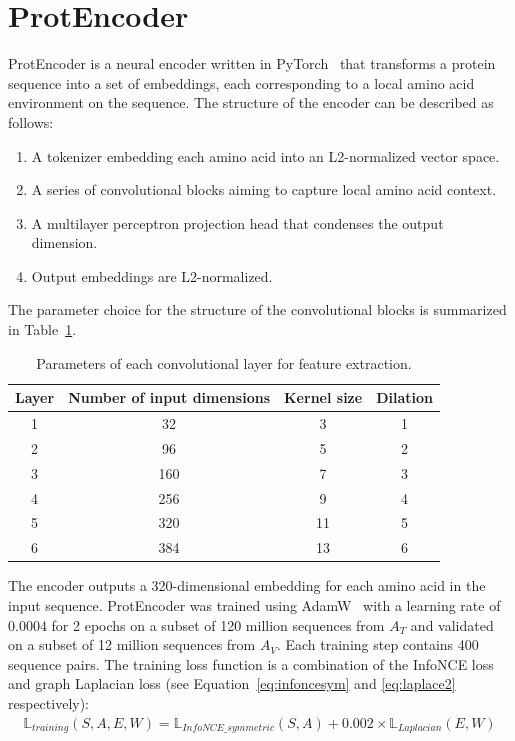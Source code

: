 \documentclass[twoside,a4paper]{master}
\begin{document}
\section{ProtEncoder}
ProtEncoder is a neural encoder written in PyTorch~\cite{10.5555/3454287.3455008} that transforms a protein sequence into a set of embeddings, each corresponding to a local amino acid environment on the sequence. The structure of the encoder can be described as follows:
\begin{enumerate}
    \item A tokenizer embedding each amino acid into an L2-normalized vector space.
    \item A series of convolutional blocks aiming to capture local amino acid context.
    \item A multilayer perceptron projection head that condenses the output dimension.
    \item Output embeddings are L2-normalized.
\end{enumerate}

The parameter choice for the structure of the convolutional blocks is summarized in Table~\ref{tab:conv}.

\begin{table}
\begin{center}
\begin{tabular}{|c|c|c|c|}
\hline
Layer & Number of input dimensions & Kernel size & Dilation \\
\hline
1& 32 & 3 & 1 \\
2& 96 & 5 & 2 \\
3& 160 & 7 & 3 \\
4& 256 & 9 & 4 \\
5& 320 & 11 & 5 \\
6& 384 & 13 & 6 \\
\hline
\end{tabular}
\caption{Parameters of each convolutional layer for feature extraction.}
\label{tab:conv}
\end{center}
\end{table}

The encoder outputs a 320-dimensional embedding for each amino acid in the input sequence. ProtEncoder was trained using AdamW~\cite{loshchilov2019decoupledweightdecayregularization} with a learning rate of \(0.0004\) for 2 epochs on a subset of 120 million sequences from \(A_T\) and validated on a subset of 12 million sequences from \(A_V\). Each training step contains 400 sequence pairs. The training loss function is a combination of the InfoNCE loss and graph Laplacian loss (see Equation~\ref{eq:infoncesym} and \ref{eq:laplace2} respectively):
\begin{align}
\mathbb{L}_{training}(S,A,E,W) = \mathbb{L}_{InfoNCE\_symmetric}(S, A) + 0.002 \times \mathbb{L}_{Laplacian}(E,W)
\end{align}
\end{document}
